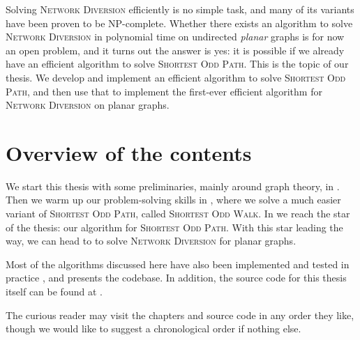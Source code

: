 Solving \textsc{Network Diversion} efficiently is no simple task, and many of its variants have been proven to be NP-complete. Whether there exists an algorithm to solve \textsc{Network Diversion} in polynomial time on undirected \emph{planar} graphs is for now an open problem, and it turns out the answer is yes: it is possible if we already have an efficient algorithm to solve \textsc{Shortest Odd Path}. This is the topic of our thesis. We develop and implement an efficient algorithm to solve \textsc{Shortest Odd Path}, and then use that to implement the first-ever efficient algorithm for \textsc{Network Diversion} on planar graphs.

\section*{Overview of the contents}
We start this thesis with some preliminaries, mainly around graph theory, in . Then we warm up our problem-solving skills in , where we solve a much easier variant of \textsc{Shortest Odd Path}, called \textsc{Shortest Odd Walk}. In  we reach the star of the thesis: our algorithm for \textsc{Shortest Odd Path}. With this star leading the way, we can head to  to solve \textsc{Network Diversion} for planar graphs. 

Most of the algorithms discussed here have also been implemented and tested in practice \cite{source:codebase}, and  presents the codebase. In addition, the source code for this thesis itself can be found at \cite{source:thesis}.

The curious reader may visit the chapters and source code in any order they like, though we would like to suggest a chronological order if nothing else.
